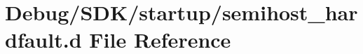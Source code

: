 \hypertarget{semihost__hardfault_8d}{}\section{Debug/\+S\+D\+K/startup/semihost\+\_\+hardfault.d File Reference}
\label{semihost__hardfault_8d}

